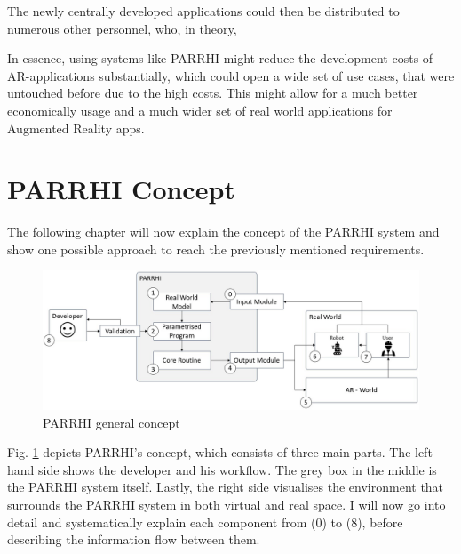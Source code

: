 The newly centrally developed applications could then be distributed to numerous other personnel, who, in theory, 

In essence, using systems like PARRHI might reduce the development costs of AR-applications substantially, which could open a wide set of use cases, that were untouched before due to the high costs. This might allow for a much better economically usage and a much wider set of real world applications for Augmented Reality apps. 

\clearpage
\section{PARRHI Concept}

The following chapter will now explain the concept of the PARRHI system and show one possible approach to reach the previously mentioned requirements.

\begin{figure}[h]
	\centering
	\includegraphics[width=1\textwidth]{Figures/PARRHIConcept03.jpg}
	\caption{PARRHI general concept}
	\label{Fig:PARRHIConcept}
\end{figure}

Fig. \ref{Fig:PARRHIConcept} depicts PARRHI's concept, which consists of three main parts. The left hand side shows the developer and his workflow. The grey box in the middle is the PARRHI system itself. Lastly, the right side visualises the environment that surrounds the PARRHI system in both virtual and real space. I will now go into detail and systematically explain each component from (0) to (8), before describing the information flow between them.

